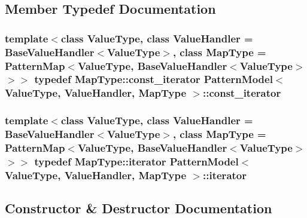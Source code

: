 \subsection{Member Typedef Documentation}
\hypertarget{classPatternModel_aecfc44c56122e8037bb634a3d66bac0a}{}
\subsubsection[{const\+\_\+iterator}]{\setlength{\rightskip}{0pt plus 5cm}template$<$class Value\+Type, class Value\+Handler = Base\+Value\+Handler$<$\+Value\+Type$>$, class Map\+Type = Pattern\+Map$<$\+Value\+Type, Base\+Value\+Handler$<$\+Value\+Type$>$$>$$>$ typedef Map\+Type\+::const\+\_\+iterator {\bf Pattern\+Model}$<$ Value\+Type, Value\+Handler, Map\+Type $>$\+::{\bf const\+\_\+iterator}}\label{classPatternModel_aecfc44c56122e8037bb634a3d66bac0a}
\hypertarget{classPatternModel_a8aedb15ca2b6f5e3d619c1878d5c0639}{}
\subsubsection[{iterator}]{\setlength{\rightskip}{0pt plus 5cm}template$<$class Value\+Type, class Value\+Handler = Base\+Value\+Handler$<$\+Value\+Type$>$, class Map\+Type = Pattern\+Map$<$\+Value\+Type, Base\+Value\+Handler$<$\+Value\+Type$>$$>$$>$ typedef Map\+Type\+::iterator {\bf Pattern\+Model}$<$ Value\+Type, Value\+Handler, Map\+Type $>$\+::{\bf iterator}}\label{classPatternModel_a8aedb15ca2b6f5e3d619c1878d5c0639}


\subsection{Constructor \& Destructor Documentation}
\hypertarget{classPatternModel_ade6d8f3c3bae062c06881d96809ea4ff}{}
